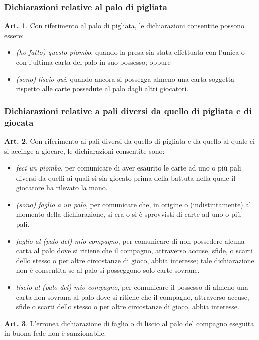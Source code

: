 \documentclass[italian,a4paper]{book}
\theoremstyle{definition}
\newtheorem{art}{Art.}
\newenvironment{packeditem}{
\begin{itemize}
  \setlength{\itemsep}{1pt}
  \setlength{\parskip}{0pt}
  \setlength{\parsep}{0pt}
}{\end{itemize}}
\begin{document}
\subsubsection{Dichiarazioni relative al palo di pigliata}
\begin{art}
    Con riferimento al palo di pigliata, le dichiarazioni consentite possono essere:
    \begin{packeditem}
\item      \emph{(ho fatto) questo piombo}, quando la presa sia stata effettuata con l'unica o con l'ultima carta del palo in suo possesso; oppure
\item      \emph{(sono) liscio qui}, quando ancora si possegga almeno una carta soggetta rispetto alle carte possedute al palo dagli altri giocatori.
    \end{packeditem}
\end{art}
\subsubsection{Dichiarazioni relative a pali diversi da quello di pigliata e
di giocata}
\begin{art}
    Con riferimento ai pali diversi da quello di pigliata e da quello al quale ci si accinge a giocare, le dichiarazioni consentite sono:
    \begin{packeditem}
\item      \emph{feci un piombo}, per comunicare di aver esaurito le carte ad uno o più pali diversi da quelli ai quali si sia giocato prima della battuta nella quale il giocatore ha rilevato la mano.
\item      \emph{(sono) faglio a un palo}, per comunicare che, in origine o (indistintamente) al momento della dichiarazione, si era o si è sprovvisti di carte ad uno o più pali.
\item      \emph{faglio al (palo del) mio compagno}, per comunicare di non possedere alcuna carta al palo dove si ritiene che il compagno, attraverso accuse, sfide, o scarti dello stesso o per altre circostanze di gioco, abbia interesse; tale dichiarazione non è consentita se al palo si posseggono solo carte sovrane.
\item      \emph{liscio al (palo del)  mio compagno}, per comunicare il possesso di almeno una carta non sovrana al palo dove si ritiene che il compagno, attraverso accuse, sfide o scarti dello stesso o per altre circostanze di gioco, abbia interesse.
    \end{packeditem}
\end{art}
\begin{art}
    L'erronea dichiarazione di faglio o di liscio al palo del compagno eseguita in buona fede non è sanzionabile.
\end{art}
\end{document}
